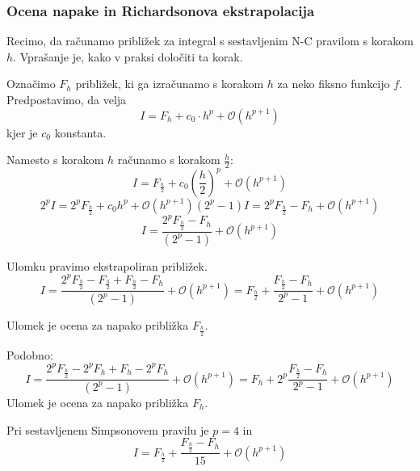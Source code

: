 \documentclass[a4paper,12pt]{article}
\theoremstyle{definition}
\theoremstyle{remark}
\begin{document}
\subsubsection{Ocena napake in Richardsonova ekstrapolacija}

Recimo, da računamo približek za integral s sestavljenim N-C pravilom s korakom $h$. Vprašanje je, kako v praksi določiti ta korak.

Označimo $F_h$ približek, ki ga izračunamo s korakom $h$ za neko fiksno funkcijo $f$. Predpostavimo, da velja
\begin{equation*}
    I = F_h + c_0 \cdot h^p + \mathscr{O} (h^{p+1})
\end{equation*}
kjer je $c_0$ konstanta.

Namesto s korakom $h$ računamo s korakom $\frac{h}{2}$:
\begin{equation*}
    I = F_{\frac{h}{2}} + c_0 (\frac{h}{2})^p + \mathscr{O} (h^{p+1})
\end{equation*}
\begin{equation*}
    2^p I = 2^p F_{\frac{h}{2}} + c_0 h^p  + \mathscr{O} (h^{p+1})
    (2^p - 1) I = 2^p F_{\frac{h}{2}} - F_h + \mathscr{O} (h^{p+1})
\end{equation*}
\begin{equation*}
    I = \frac{2^p F_{\frac{h}{2}} - F_h}{(2^p - 1)} + \mathscr{O} (h^{p+1})
\end{equation*}

Ulomku pravimo ekstrapoliran približek.
\begin{equation*}
    I = \frac{2^p F_{\frac{h}{2}} - F_{\frac{h}{2}} + F_{\frac{h}{2}} -  F_h}{(2^p - 1)} + \mathscr{O} (h^{p+1})
    = F_{\frac{h}{2}} + \frac{F_{\frac{h}{2}} - F_h}{2^p - 1}+ \mathscr{O} (h^{p+1})
\end{equation*}

Ulomek je ocena za napako približka $F_{\frac{h}{2}}$.

Podobno:
\begin{equation*}
    I = \frac{2^p F_{\frac{h}{2}} - 2^p F_h + F_h - 2^p F_h}{(2^p - 1)} + \mathscr{O} (h^{p+1})
    = F_h + 2^p \frac{F_{\frac{h}{2}} - F_h}{2^p - 1} + \mathscr{O} (h^{p+1})
\end{equation*}
Ulomek je ocena za napako približka $F_h$.

Pri sestavljenem Simpsonovem pravilu je $p = 4$ in
\begin{equation*}
    I = F_{\frac{h}{2}} + \frac{F_{\frac{h}{2}} - F_h}{15} + \mathscr{O} (h^{p+1})
\end{equation*}
\end{document}

